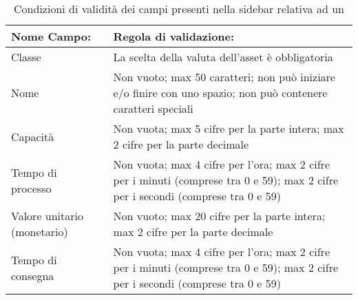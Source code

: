 		\begin{table}[H]
			\centering
			\begin{tabular}{ p{3cm}p{0cm}p{10.5cm}}
				\toprule
				\textbf{Nome Campo:} & & \textbf{Regola di validazione:} \\
				\midrule
				{Classe} & & {La scelta della valuta dell'asset è obbligatoria}
				\\ \hline
				{Nome} & & {Non vuoto; max 50 caratteri; non può iniziare e/o finire con uno spazio; non può contenere caratteri speciali} \\ \hline
				{Capacità} & &{Non vuota; max 5 cifre per la parte intera; max 2 cifre per la parte decimale} \\ \hline
				{Tempo di processo} & &{Non vuota; max 4 cifre per l'ora; max 2 cifre per i minuti (comprese tra 0 e 59); max 2 cifre per i secondi (comprese tra 0 e 59)} \\ \hline
				{Valore unitario (monetario)} & &{Non vuoto; max 20 cifre per la parte intera; max 2 cifre per la parte decimale} \\ \hline
				{Tempo di consegna} & &{Non vuota; max 4 cifre per l'ora; max 2 cifre per i minuti (comprese tra 0 e 59); max 2 cifre per i secondi (comprese tra 0 e 59)} \\ \hline
			\end{tabular}
			\caption{Condizioni di validità dei campi presenti nella sidebar relativa ad un  }
		\end{table}

